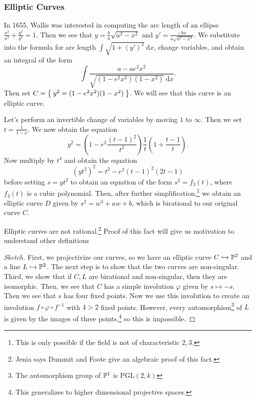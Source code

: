\documentclass[twoside, 10pt]{article}
\renewcommand{\d}{\ \mathrm{d}}
\begin{document}
    \subsubsection{Elliptic Curves}%
    In 1655, Wallis was interested in computing the arc length of an ellipse $\frac{x^2}{a^2} + \frac{y^2}{b^2} = 1$. Then we see that $y = \frac{b}{a} \sqrt{a^2-x^2}$ and $y' = \frac{-bx}{a\sqrt{a^2-x^2}}$. We substitute into the formula for arc length $\int \sqrt{1+(y')^2} \d x$, change variables, and obtain an integral of the form \[ \int \frac{a-ae^2x^2}{\sqrt{(1-e^2x^2)(1-x^2)} \d x}. \] Then set $C = \Set{y^2 = (1-e^2x^2)(1-x^2)}$. We will see that this curve is an elliptic curve.

    Let's perform an invertible change of variables by moving $1$ to $\infty$. Then we set $t = \frac{1}{1-x}$. We now obtain the equation \[y^2 = \left( 1-e^2 \frac{(t-1)^2}{t^2} \right) \frac{1}{t} \left( 1+ \frac{t-1}{t} \right).\] Now multiply by $t^4$ and obtain the equation \[ (yt^2)^2 = t^2-e^2(t-1)^2(2t-1) \] before setting $s=yt^2$ to obtain an equation of the form $s^2 = f_3(t)$, where $f_3(t)$ is a cubic polynomial. Then, after further simplification,\footnote{This is only possible if the field is not of characteristic $2,3$.} we obtain an elliptic curve $D$ given by $s^2 = w^3 + aw+b$, which is birational to our original curve $C$.

    \begin{thm}
        Elliptic curves are not rational.\footnote{Jenia says Dummit and Foote give an algebraic proof of this fact.} Proof of this fact will give us motivation to understand other definitions
        \begin{proof}[Sketch]
            First, we projectivize our curves, so we have an elliptic curve $C \hookrightarrow \P^2$ and a line $L \hookrightarrow \P^2$. The next step is to show that the two curves are non-singular. Third, we show that if $C,L$ are birational and non-singular, then they are isomorphic. Then, we see that $C$ has a simple involution $\varphi$ given by $s \mapsto -s$. Then we see that $s$ has four fixed points. Now we use this involution to create an involution $f \circ \varphi \circ f^{-1}$ with $4 > 2$ fixed points. However, every automorphism\footnote{The automorphism group of $\P^1$ is $\mathrm{PGL}(2,k)$} of $L$ is given by the images of three points,\footnote{This generalizes to higher dimensional projective spaces.} so this is impossible.
        \end{proof}
    \end{thm}
\end{document}
